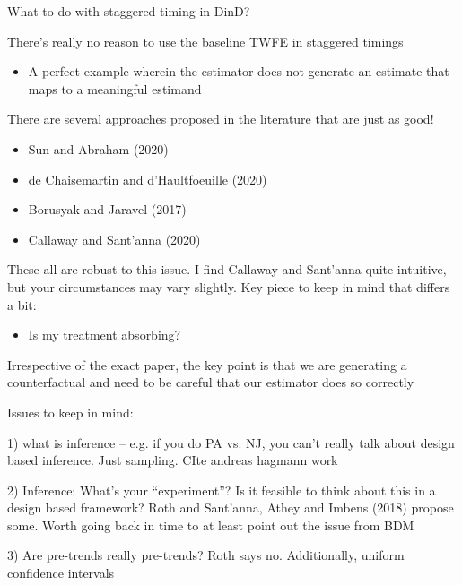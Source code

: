 \documentclass[notes,11pt, aspectratio=169]{beamer}
\newenvironment{wideitemize}{\itemize\addtolength{\itemsep}{10pt}}{\enditemize}
\begin{document}
\begin{frame}{What to do with staggered timing in DinD?}
  \begin{wideitemize}
  \item There's really no reason to use the baseline TWFE in staggered timings
    \begin{itemize}
    \item A perfect example wherein the estimator does not generate an
      estimate that maps to a meaningful estimand
    \end{itemize}
  \item There are several approaches proposed in the literature that are just as good!
    \begin{itemize}
    \item Sun and Abraham (2020)
    \item de Chaisemartin and  d'Haultfoeuille (2020)
    \item Borusyak and Jaravel (2017)
    \item Callaway and Sant'anna (2020)      
    \end{itemize}
  \item These all are robust to this issue. I find Callaway and
    Sant'anna quite intuitive, but your circumstances may vary
    slightly. Key piece to keep in mind that differs a bit: 
    \begin{itemize}
    \item Is my treatment absorbing?
    \end{itemize}
  \item Irrespective of the exact paper, the key point is that we are
    generating a counterfactual and need to be careful that our
    estimator does so correctly
  \end{wideitemize}
\end{frame}

\begin{frame}
  Issues to keep in mind:

  1) what is inference -- e.g. if you do PA vs. NJ, you can't really talk about design based inference. Just sampling. CIte andreas hagmann work

  2) Inference: What's your ``experiment''? Is it feasible to think
  about this in a design based framework? Roth and Sant'anna, Athey
  and Imbens (2018) propose some. Worth going back in time to at least
  point out the issue from BDM

  3) Are pre-trends really pre-trends? Roth says no. Additionally, uniform confidence intervals


\end{frame}
\end{document}
